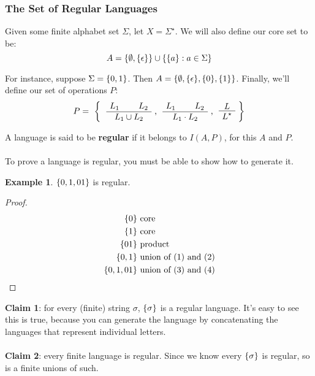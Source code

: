 \documentclass[]{article}
\DeclarePairedDelimiter{\set}{\lbrace}{\rbrace}
\theoremstyle{definition}
\newtheorem{ex}{Example}[section]
\begin{document}
        \subsubsection{The Set of Regular Languages}
          Given some finite alphabet set $\Sigma$, let $X = \Sigma^\star$. We will also define our core set to be:
          $$
            A = \set{\emptyset, \set{\epsilon}} \cup \set{ \set{a} : a \in \Sigma }
          $$

          For instance, suppose $\Sigma = \set{0, 1}$. Then $A = \set{ \emptyset, \set{ \epsilon }, \set{ 0 }, \set{ 1 } }$. Finally, we'll define our set of operations $P$:
          $$
            P = \text{ \bigg\{ \AxiomC{$L_1$} \AxiomC{$L_2$} \BinaryInfC{$L_1 \cup L_2$} \DisplayProof, \AxiomC{$L_1$} \AxiomC{$L_2$} \BinaryInfC{$L_1 \cdot L_2$} \DisplayProof, \AxiomC{$L$} \UnaryInfC{$L^\star$} \DisplayProof \bigg\}}
          $$

          A language is said to be \textbf{regular} if it belongs to $I(A, P)$, for this $A$ and $P$.
          \\ \\
          To prove a language is regular, you must be able to show how to generate it.

          \begin{ex}
            $\set{0, 1, 01}$ is regular.
            \begin{proof}
              \begin{align}
                \set{0} &\text{ core} \\
                \set{1} &\text{ core} \\
                \set{01} &\text{ product} \\
                \set{0, 1} &\text{ union of (1) and (2)} \\
                \set{0, 1, 01} &\text{ union of (3) and (4)}
              \end{align}
              \setcounter{equation}{0}
            \end{proof}
          \end{ex}

          \textbf{Claim 1}: for every (finite) string $\sigma$, $\set{\sigma}$ is a regular language. It's easy to see this is true, because you can generate the language by concatenating the languages that represent individual letters.
          \\ \\
          \textbf{Claim 2}: every finite language is regular. Since we know every $\set{\sigma}$ is regular, so is a finite unions of such.
\end{document}
